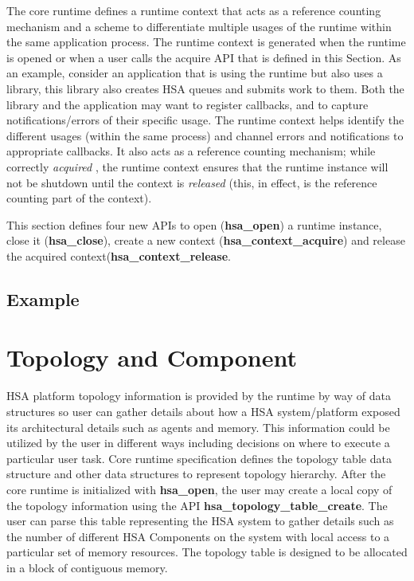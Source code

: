 \documentclass{book}
\newcommand{\emphld}[1]{\begin{DIFnomarkup} \emph{#1}
\end{DIFnomarkup}}
\newcommand{\reffun}[1]{\textbf{#1}}
\newenvironment{DIFnomarkup}{}{}
\begin{document}
The core runtime defines a runtime context that acts as a reference
counting mechanism and a scheme to differentiate multiple usages of
the runtime within the same application process. The runtime context
is generated when the runtime is opened or when a
user calls the acquire API that is defined in this Section. As an
example, consider an application that is using the runtime but also
uses a library, this library also creates HSA queues and submits
work to them. Both the library and the application may want to register
callbacks, and to capture notifications/errors of their specific
usage. The runtime context helps identify the different usages (within
the same process) and channel errors and notifications to
appropriate callbacks. It also acts as a reference counting
mechanism; while correctly \emphld{acquired}, the runtime context
ensures that the runtime instance will not be shutdown until the
context is \emphld{released} (this, in effect, is the reference
counting part of the context).

This section defines four new APIs to open (\reffun{hsa\_open}) a
runtime instance, close it (\reffun{hsa\_close}), create a new context
(\reffun{hsa\_context\_acquire}) and release the acquired
context(\reffun{hsa\_context\_release}.



\subsection{Example}


 \hypertarget{component}{}\section{Topology and Component
}\label{topology} HSA platform topology information is provided by the
runtime by way of data structures so user can gather details about how
a HSA system/platform exposed its architectural details such as agents
and memory. This information could be utilized by the user in
different ways including decisions on where to execute a particular
user task. Core runtime specification defines the topology table data
structure and other data structures to represent topology hierarchy.
After the core runtime is initialized with \reffun{hsa\_open}, the user
may create a local copy of the topology information using the API
\reffun{hsa\_topology\_table\_create}. The user can parse this table
representing the HSA system to gather details such as the number of
different HSA Components on the system with local access to a
particular set of memory resources. The topology table is designed to
be allocated in a block of contiguous memory.
\end{document}
